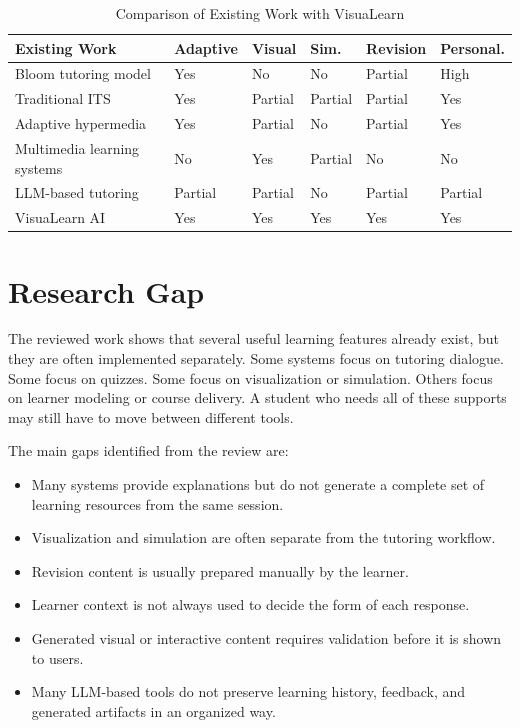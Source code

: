 \begin{longtable}{p{}p{}p{}p{}p{}p{}}
\caption{Comparison of Existing Work with VisuaLearn}\\
\toprule
\textbf{Existing Work} & \textbf{Adaptive} & \textbf{Visual} & \textbf{Sim.} & \textbf{Revision} & \textbf{Personal.}\\
\midrule
Bloom tutoring model \cite{Bloom1984} & Yes & No & No & Partial & High\\
Traditional ITS \cite{VanLehn2011,Ma2014} & Yes & Partial & Partial & Partial & Yes\\
Adaptive hypermedia \cite{Brusilovsky2007} & Yes & Partial & No & Partial & Yes\\
Multimedia learning systems \cite{Mayer2009} & No & Yes & Partial & No & No\\
LLM-based tutoring \cite{Kasneci2023} & Partial & Partial & No & Partial & Partial\\
VisuaLearn AI & Yes & Yes & Yes & Yes & Yes\\
\bottomrule
\end{longtable}

\section[Research Gap]{\textbf{Research Gap}}

The reviewed work shows that several useful learning features already exist, but they are often implemented separately. Some systems focus on tutoring dialogue. Some focus on quizzes. Some focus on visualization or simulation. Others focus on learner modeling or course delivery. A student who needs all of these supports may still have to move between different tools.

The main gaps identified from the review are:
\begin{itemize}[leftmargin=1.2cm]
\item Many systems provide explanations but do not generate a complete set of learning resources from the same session.
\item Visualization and simulation are often separate from the tutoring workflow.
\item Revision content is usually prepared manually by the learner.
\item Learner context is not always used to decide the form of each response.
\item Generated visual or interactive content requires validation before it is shown to users.
\item Many LLM-based tools do not preserve learning history, feedback, and generated artifacts in an organized way.
\end{itemize}

